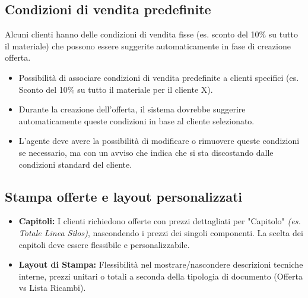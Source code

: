 \documentclass[12pt, a4paper]{article} %
\begin{document}
\subsection{Condizioni di vendita predefinite}
Alcuni clienti hanno delle condizioni di vendita fisse (es. sconto del 10\% su
tutto il materiale) che possono essere suggerite automaticamente in fase di
creazione offerta.
\begin{itemize}
      \item Possibilità di associare condizioni di vendita predefinite a clienti specifici
            (es. Sconto del 10\% su tutto il materiale per il cliente X).
      \item Durante la creazione dell'offerta, il sistema dovrebbe suggerire
            automaticamente queste condizioni in base al cliente selezionato.
      \item L'agente deve avere la possibilità di modificare o rimuovere queste condizioni
            se necessario, ma con un avviso che indica che si sta discostando dalle
            condizioni standard del cliente.
\end{itemize}

\subsection{Stampa offerte e layout personalizzati}
\begin{itemize}
      \item \textbf{Capitoli:} I clienti richiedono offerte con prezzi dettagliati per "Capitolo" \textit{(es. Totale Linea Silos)}, nascondendo i prezzi dei singoli componenti.
            La scelta dei capitoli deve essere flessibile e personalizzabile.
      \item \textbf{Layout di Stampa:} Flessibilità nel mostrare/nascondere descrizioni tecniche interne, prezzi unitari o totali a seconda della tipologia di documento (Offerta vs Lista Ricambi).
\end{itemize}
\end{document}

